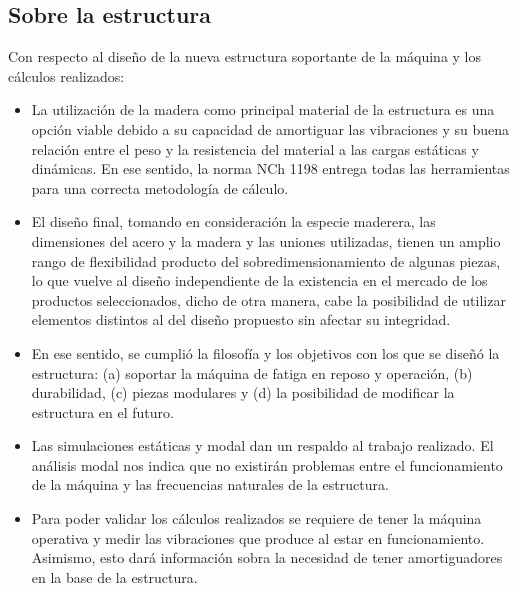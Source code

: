 \subsection{Sobre la estructura}
Con respecto al diseño de la nueva estructura soportante de la máquina y los cálculos realizados:
\begin{itemize}
	\item La utilización de la madera como principal material de la estructura es una opción viable debido a su capacidad de amortiguar las vibraciones y su buena relación entre el peso y la resistencia del material a las cargas estáticas y dinámicas. En ese sentido, la norma NCh 1198 entrega todas las herramientas para una correcta metodología de cálculo.
	\item El diseño final, tomando en consideración la especie maderera, las dimensiones del acero y la madera y las uniones utilizadas, tienen un amplio rango de flexibilidad producto del sobredimensionamiento de algunas piezas, lo que vuelve al diseño independiente de la existencia en el mercado de los productos seleccionados, dicho de otra manera, cabe la posibilidad de utilizar elementos distintos al del diseño propuesto sin afectar su integridad.
	\item En ese sentido, se cumplió la filosofía y los objetivos con los que se diseñó la estructura: (a) soportar la máquina de fatiga en reposo y operación, (b) durabilidad, (c) piezas modulares y (d) la posibilidad de modificar la estructura en el futuro.
	\item Las simulaciones estáticas y modal dan un respaldo al trabajo realizado. El análisis modal nos indica que no existirán problemas entre el funcionamiento de la máquina y las frecuencias naturales de la estructura.
	\item Para poder validar los cálculos realizados se requiere de tener la máquina operativa y medir las vibraciones que produce al estar en funcionamiento. Asimismo, esto dará información sobra la necesidad de tener amortiguadores en la base de la estructura.
\end{itemize}

